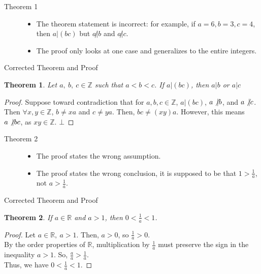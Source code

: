 \documentclass[10pt]{extarticle}
\title{}
\author{Avinash Iyer}
\date{}
\newtheorem{theorem}{Theorem}
\newcommand{\Z}{\mathbb{Z}}
\newcommand{\R}{\mathbb{R}}
\begin{document}
  \begin{description}
    \item[Theorem 1] \hfill
      \begin{itemize}
        \item The theorem statement is incorrect: for example, if $a=6,b=3,c=4$, then $a|(bc)$ but $a\not| b$ and $a\not|c$.
        \item The proof only looks at one case and generalizes to the entire integers.
      \end{itemize}
  \end{description}
  \begin{problem}{Corrected Theorem and Proof}
    \begin{theorem}
      Let $a,~b,~c\in \Z$ such that $a<b<c$. If $a|(bc)$, then $a|b$ or $a|c$
    \end{theorem}
    \begin{proof}
      Suppose toward contradiction that for  $a,b,c\in\Z$, $a \vert (bc)$, $a\not\vert b$, and $a\not\vert c$. Then $\forall x,y\in\Z$, $b\neq xa$ and $c \neq ya$. Then, $bc \neq (xy)a$. However, this means $a \not\vert bc$, as $xy\in\Z$. $\bot$
    \end{proof}
  \end{problem}
  \begin{description}
    \item[Theorem 2] \hfill
      \begin{itemize}
        \item The proof states the wrong assumption.
        \item The proof states the wrong conclusion, it is supposed to be that $1 > \frac{1}{a}$, not $a > \frac{1}{a}$.
      \end{itemize}
  \end{description}
  \begin{problem}{Corrected Theorem and Proof}
    \begin{theorem}
      If $a\in\R$ and $a > 1$, then $0 < \frac{1}{a} < 1$.
    \end{theorem}
    \begin{proof}
      Let $a\in\R,~a>1$. Then, $a > 0$, so $\frac{1}{a} > 0$.\\

      By the order properties of $\R$, multiplication by $\frac{1}{a}$ must preserve the sign in the inequality $a > 1$. So, $\frac{a}{a} > \frac{1}{a}$.\\

      Thus, we have $0 < \frac{1}{a} < 1$.
    \end{proof}
  \end{problem}
\end{document}
